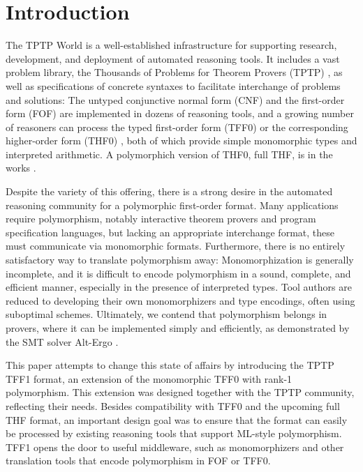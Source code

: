 \section{Introduction}
\label{sec_intro}

The TPTP World \cite{sutcliffe-2010-world} is a well-established infrastructure
for supporting research, development, and deployment of automated reasoning
tools. It includes a vast problem library, the Thousands of Problems for Theorem
Provers (TPTP) \cite{sutcliffe-2009-lib}, as well as specifications of concrete
syntaxes to facilitate interchange of problems and solutions: The untyped
conjunctive normal form (CNF) and the first-order form (FOF) are implemented in
dozens of reasoning tools, and a growing number of reasoners can process the
typed first-order form (TFF0) \cite{TFF0} or the corresponding higher-order form
(THF0) \cite{benzmueller-et-al-2008-thf0}, both of which provide simple
monomorphic types and interpreted arithmetic. A polymorphich version of THF0,
full THF, is in the works \cite{sutcliffe-benzmueller-2010}.

Despite the variety of this offering, there is a strong desire in the automated
reasoning community for a polymorphic first-order format. Many applications
require polymorphism, notably interactive theorem provers and program
specification languages, but lacking an appropriate interchange format, these
must communicate via monomorphic formats. Furthermore, there is no entirely
satisfactory way to translate polymorphism away: Monomorphization is generally
incomplete, and it is difficult to encode polymorphism in a sound, complete, and
efficient manner, especially in the presence of interpreted types. Tool authors
are reduced to developing their own monomorphizers and type encodings, often
using suboptimal schemes. Ultimately, we contend that polymorphism belongs in
provers, where it can be implemented simply and efficiently, as demonstrated by
the SMT solver Alt-Ergo \cite{bobot-et-al-2008}.

This paper attempts to change this state of affairs by introducing the TPTP TFF1
format, an extension of the monomorphic TFF0 with rank-1 polymorphism. This
extension was designed together with the TPTP community, reflecting their needs.
Besides compatibility with TFF0 and the upcoming full THF format, an important
design goal was to ensure that the format can easily be processed by existing
reasoning tools that support ML-style polymorphism. TFF1 opens the door to
useful middleware, such as monomorphizers and other translation tools that
encode polymorphism in FOF or TFF0.


